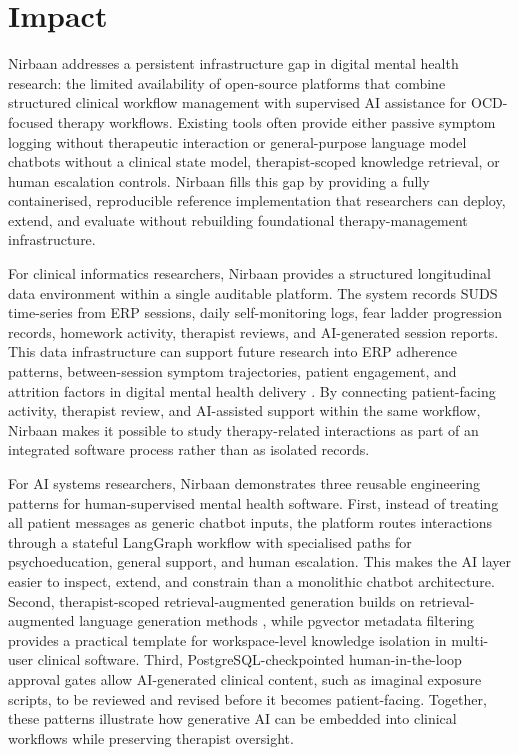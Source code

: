 \documentclass[preprint,12pt,a4paper]{elsarticle}
\begin{document}
\section{Impact}

Nirbaan addresses a persistent infrastructure gap in digital mental health research: the limited availability of open-source platforms that combine structured clinical workflow management with supervised AI assistance for OCD-focused therapy workflows. Existing tools often provide either passive symptom logging without therapeutic interaction or general-purpose language model chatbots without a clinical state model, therapist-scoped knowledge retrieval, or human escalation controls. Nirbaan fills this gap by providing a fully containerised, reproducible reference implementation that researchers can deploy, extend, and evaluate without rebuilding foundational therapy-management infrastructure.

For clinical informatics researchers, Nirbaan provides a structured longitudinal data environment within a single auditable platform. The system records SUDS time-series from ERP sessions, daily self-monitoring logs, fear ladder progression records, homework activity, therapist reviews, and AI-generated session reports. This data infrastructure can support future research into ERP adherence patterns, between-session symptom trajectories, patient engagement, and attrition factors in digital mental health delivery \cite{simpson2011, linardon2020}. By connecting patient-facing activity, therapist review, and AI-assisted support within the same workflow, Nirbaan makes it possible to study therapy-related interactions as part of an integrated software process rather than as isolated records.

For AI systems researchers, Nirbaan demonstrates three reusable engineering patterns for human-supervised mental health software. First, instead of treating all patient messages as generic chatbot inputs, the platform routes interactions through a stateful LangGraph workflow with specialised paths for psychoeducation, general support, and human escalation. This makes the AI layer easier to inspect, extend, and constrain than a monolithic chatbot architecture. Second, therapist-scoped retrieval-augmented generation builds on retrieval-augmented language generation methods \cite{lewis2020rag}, while pgvector metadata filtering provides a practical template for workspace-level knowledge isolation in multi-user clinical software. Third, PostgreSQL-checkpointed human-in-the-loop approval gates allow AI-generated clinical content, such as imaginal exposure scripts, to be reviewed and revised before it becomes patient-facing. Together, these patterns illustrate how generative AI can be embedded into clinical workflows while preserving therapist oversight.
\end{document}
